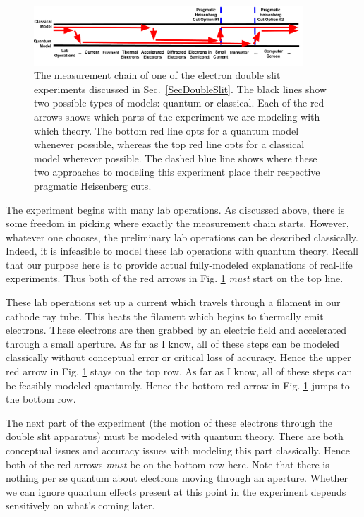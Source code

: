 \documentclass[prd,twocolumn,superscriptaddress,floatfix,amsmath,amssymb,amsfonts,nofootinbib]{revtex4-2}
\begin{document}
\begin{figure}[t]
\includegraphics[width=0.9\textwidth]{Figures/HeisenbergCut2.pdf}
\caption{The measurement chain of one of the electron double slit experiments discussed in Sec.~\ref{SecDoubleSlit}. The black lines show two possible types of models: quantum or classical. Each of the red arrows shows which parts of the experiment we are modeling with which theory. The bottom red line opts for a quantum model whenever possible, whereas the top red line opts for a classical model wherever possible. The dashed blue line shows where these two approaches to modeling this experiment place their respective pragmatic Heisenberg cuts.}\label{FigHCut2}
\end{figure}

The experiment begins with many lab operations. As discussed above, there is some freedom in picking where exactly the measurement chain starts. However, whatever one chooses, the preliminary lab operations can be described classically. Indeed, it is infeasible to model these lab operations with quantum theory. Recall that our purpose here is to provide actual fully-modeled explanations of real-life experiments. Thus both of the red arrows in Fig. \ref{FigHCut2} \textit{must} start on the top line.

These lab operations set up a current which travels through a filament in our cathode ray tube. This heats the filament which begins to thermally emit electrons. These electrons are then grabbed by an electric field and accelerated through a small aperture. As far as I know, all of these steps can be modeled classically without conceptual error or critical loss of accuracy. Hence the upper red arrow in Fig. \ref{FigHCut2} stays on the top row. As far as I know, all of these steps can be feasibly modeled quantumly. Hence the bottom red arrow in Fig. \ref{FigHCut2} jumps to the bottom row.

The next part of the experiment (the motion of these electrons through the double slit apparatus) must be modeled with quantum theory. There are both conceptual issues and accuracy issues with modeling this part classically. Hence both of the red arrows \textit{must} be on the bottom row here. Note that there is nothing per se quantum about electrons moving through an aperture. Whether we can ignore quantum effects present at this point in the experiment depends sensitively on what's coming later. 
\end{document}
